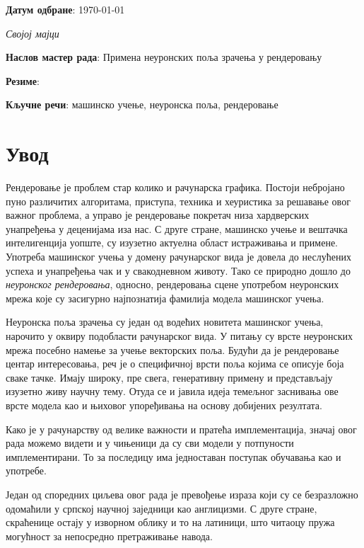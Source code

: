 \documentclass[12pt, a4paper, twoside]{book}
\numberwithin{equation}{chapter}
\numberwithin{theorem}{section}
\numberwithin{definition}{section}
\numberwithin{definitionChapter}{chapter}
\begin{document}
\noindent \textbf{Датум одбране}: \today
\hspace{0pt}
\vfill

\newpage
\thispagestyle{empty}
\textit{Својој мајци}

\newpage
\thispagestyle{empty}
\noindent \textbf{Наслов мастер рада}: Примена неуронских поља зрачења у рендеровању

\noindent \textbf{Резиме}:

\noindent \textbf{Кључне речи}: машинско учење, неуронска поља, рендеровање

\listoffigures
\listoftables
\tableofcontents

\chapter{Увод}
Рендеровање је проблем стар колико и рачунарска графика. Постоји небројано пуно различитих
алгоритама, приступа, техника и хеуристика за решавање овог важног проблема, а управо је
рендеровање покретач низа хардверских унапређења у деценијама иза нас. С друге стране,
машинско учење и вештачка интелигенција уопште, су изузетно актуелна област истраживања и примене.
Употреба машинског учења у домену рачунарског вида је довела до неслућених успеха и унапређења
чак и у свакодневном животу. Тако се природно дошло до \textit{неуронског рендеровања},
односно, рендеровања сцене употребом неуронских мрежа које су засигурно најпознатија фамилија модела
машинског учења.

Неуронска поља зрачења су један од водећих новитета машинског учења, нарочито у оквиру
подобласти рачунарског вида. У питању су врсте неуронских мрежа посебно намење за учење векторских поља.
Будући да је рендеровање центар интересовања, реч је о специфичној врсти поља којима се описује боја
сваке тачке. Имају широку, пре свега, генеративну примену и представљају изузетно живу научну тему.
Отуда се и јавила идеја темељног заснивања ове врсте модела као и њиховог упоређивања на основу добијених
резултата.

Како је у рачунарству од велике важности и пратећа имплементација, значај овог рада можемо видети 
и у чињеници да су сви модели у потпуности имплементирани. То за последицу има једноставан поступак
обучавања као и употребе.

Један од споредних циљева овог рада је превођење израза који су се безразложно одомаћили
у српској научној заједници као англицизми. С друге стране, скраћенице остају у изворном
облику и то на латиници, што читаоцу пружа могућност за непосредно претраживање навода.
\end{document}
